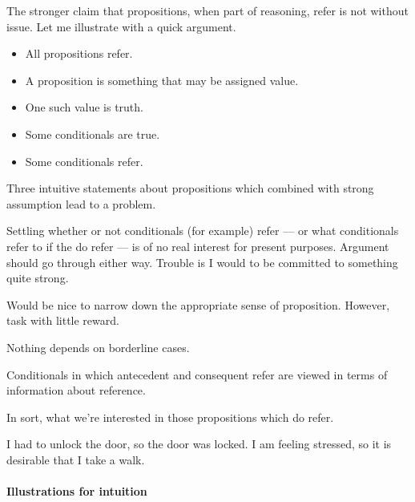 \begin{note}
  The stronger claim that propositions, when part of reasoning, refer is not without issue.
  Let me illustrate with a quick argument.

  \begin{itemize}
  \item All propositions refer.
  \item A proposition is something that may be assigned value.
  \item One such value is truth.
  \item Some conditionals are true.
  \item Some conditionals refer.
  \end{itemize}

  Three intuitive statements about propositions which combined with strong assumption lead to a problem.

  Settling whether or not conditionals (for example) refer --- or what conditionals refer to if the do refer --- is of no real interest for present purposes.
  Argument should go through either way.
  Trouble is I would to be committed to something quite strong.

  Would be nice to narrow down the appropriate sense of proposition.
  However, task with little reward.

  Nothing depends on borderline cases.

  Conditionals in which antecedent and consequent refer are viewed in terms of information about reference.

  In sort, what we're interested in those propositions which do refer.

  I had to unlock the door, so the door was locked.
  I am feeling stressed, so it is desirable that I take a walk.
\end{note}

\paragraph*{Illustrations for intuition}


